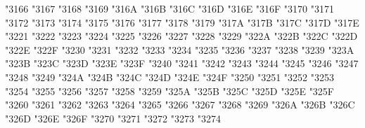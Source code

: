 {\Uchar\jis"3166 %
\Uchar\jis"3167 %
\Uchar\jis"3168 %
\Uchar\jis"3169 %
\Uchar\jis"316A %
\Uchar\jis"316B %
\Uchar\jis"316C %
\Uchar\jis"316D %
\Uchar\jis"316E %
\Uchar\jis"316F %
\Uchar\jis"3170 %
\Uchar\jis"3171 %
\Uchar\jis"3172 %
\Uchar\jis"3173 %
\Uchar\jis"3174 %
\Uchar\jis"3175 %
\Uchar\jis"3176 %
\Uchar\jis"3177 %
\Uchar\jis"3178 %
\Uchar\jis"3179 %
\Uchar\jis"317A %
\Uchar\jis"317B %
\Uchar\jis"317C %
\Uchar\jis"317D %
\Uchar\jis"317E %
\Uchar\jis"3221 %
\Uchar\jis"3222 %
\Uchar\jis"3223 %
\Uchar\jis"3224 %
\Uchar\jis"3225 %
\Uchar\jis"3226 %
\Uchar\jis"3227 %
\Uchar\jis"3228 %
\Uchar\jis"3229 %
\Uchar\jis"322A %
\Uchar\jis"322B %
\Uchar\jis"322C %
\Uchar\jis"322D %
\Uchar\jis"322E %
\Uchar\jis"322F %
\Uchar\jis"3230 %
\Uchar\jis"3231 %
\Uchar\jis"3232 %
\Uchar\jis"3233 %
\Uchar\jis"3234 %
\Uchar\jis"3235 %
\Uchar\jis"3236 %
\Uchar\jis"3237 %
\Uchar\jis"3238 %
\Uchar\jis"3239 %
\Uchar\jis"323A %
\Uchar\jis"323B %
\Uchar\jis"323C %
\Uchar\jis"323D %
\Uchar\jis"323E %
\Uchar\jis"323F %
\Uchar\jis"3240 %
\Uchar\jis"3241 %
\Uchar\jis"3242 %
\Uchar\jis"3243 %
\Uchar\jis"3244 %
\Uchar\jis"3245 %
\Uchar\jis"3246 %
\Uchar\jis"3247 %
\Uchar\jis"3248 %
\Uchar\jis"3249 %
\Uchar\jis"324A %
\Uchar\jis"324B %
\Uchar\jis"324C %
\Uchar\jis"324D %
\Uchar\jis"324E %
\Uchar\jis"324F %
\Uchar\jis"3250 %
\Uchar\jis"3251 %
\Uchar\jis"3252 %
\Uchar\jis"3253 %
\Uchar\jis"3254 %
\Uchar\jis"3255 %
\Uchar\jis"3256 %
\Uchar\jis"3257 %
\Uchar\jis"3258 %
\Uchar\jis"3259 %
\Uchar\jis"325A %
\Uchar\jis"325B %
\Uchar\jis"325C %
\Uchar\jis"325D %
\Uchar\jis"325E %
\Uchar\jis"325F %
\Uchar\jis"3260 %
\Uchar\jis"3261 %
\Uchar\jis"3262 %
\Uchar\jis"3263 %
\Uchar\jis"3264 %
\Uchar\jis"3265 %
\Uchar\jis"3266 %
\Uchar\jis"3267 %
\Uchar\jis"3268 %
\Uchar\jis"3269 %
\Uchar\jis"326A %
\Uchar\jis"326B %
\Uchar\jis"326C %
\Uchar\jis"326D %
\Uchar\jis"326E %
\Uchar\jis"326F %
\Uchar\jis"3270 %
\Uchar\jis"3271 %
\Uchar\jis"3272 %
\Uchar\jis"3273 %
\Uchar\jis"3274 %
}
